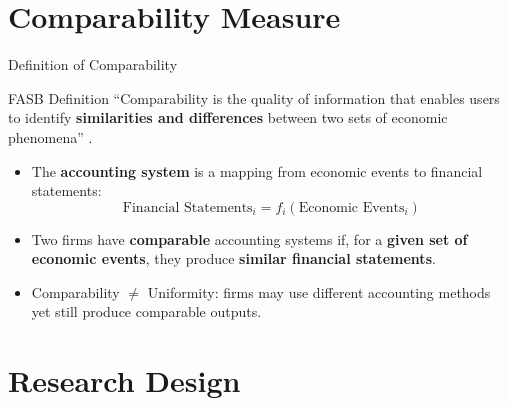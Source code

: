 \documentclass[aspectratio=169,xcolor=dvipsnames]{beamer}
\begin{document}
\section{Comparability Measure}

\begin{frame}{Definition of Comparability}
    \begin{block}{FASB Definition}
        ``Comparability is the quality of information that enables users to identify \textbf{similarities and differences} between two sets of economic phenomena'' \citep{fasb1980}.
    \end{block}
    \vspace{0.3cm}
    \begin{itemize}
        \item The \textbf{accounting system} is a mapping from economic events to financial statements:
        \[
            \text{Financial Statements}_i = f_i(\text{Economic Events}_i)
        \]
        \item Two firms have \textcolor{hkustred}{\textbf{comparable}} accounting systems if, for a \textbf{given set of economic events}, they produce \textbf{similar financial statements}.
        \item Comparability $\neq$ Uniformity: firms may use different accounting methods yet still produce comparable outputs.
    \end{itemize}
\end{frame}


\section{Research Design}
\end{document}
